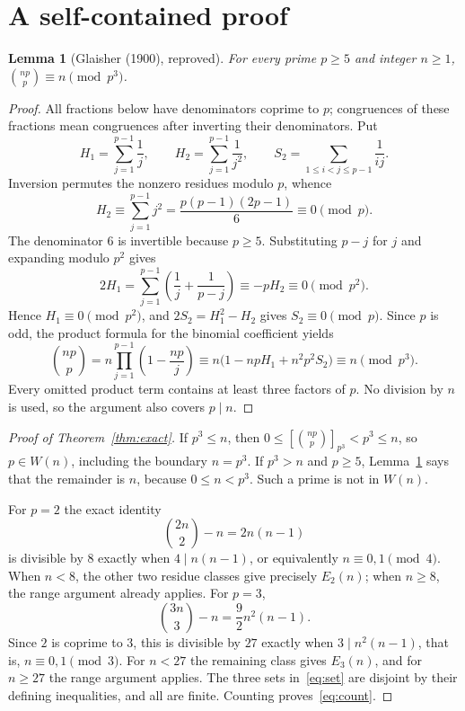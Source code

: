 \documentclass[11pt]{article}
\newtheorem{lemma}[theorem]{Lemma}
\newcommand{\binrem}[3]{\left[\binom{#1#2}{#2}\right]_{#2^{#3}}}
\begin{document}
\section{A self-contained proof}
\begin{lemma}[Glaisher (1900), reproved]\label{lem:glaisher}
For every prime $p\ge5$ and integer $n\ge1$,
$\binom{np}{p}\equiv n\pmod{p^3}$.
\end{lemma}
\begin{proof}
All fractions below have denominators coprime to $p$; congruences of these
fractions mean congruences after inverting their denominators. Put
\[
 H_1=\sum_{j=1}^{p-1}\frac1j,\qquad
 H_2=\sum_{j=1}^{p-1}\frac1{j^2},\qquad
 S_2=\sum_{1\le i<j\le p-1}\frac1{ij}.
\]
Inversion permutes the nonzero residues modulo $p$, whence
\[
 H_2\equiv\sum_{j=1}^{p-1}j^2
 =\frac{p(p-1)(2p-1)}6\equiv0\pmod p.
\]
The denominator $6$ is invertible because $p\ge5$. Substituting $p-j$ for
$j$ and expanding modulo $p^2$ gives
\[
 2H_1=\sum_{j=1}^{p-1}\left(\frac1j+\frac1{p-j}\right)
 \equiv-pH_2\equiv0\pmod{p^2}.
\]
Hence $H_1\equiv0\pmod{p^2}$, and
$2S_2=H_1^2-H_2$ gives $S_2\equiv0\pmod p$.
Since $p$ is odd, the product formula for the binomial coefficient yields
\[
 \binom{np}{p}
 =n\prod_{j=1}^{p-1}\left(1-\frac{np}{j}\right)
 \equiv n\bigl(1-npH_1+n^2p^2S_2\bigr)
 \equiv n\pmod{p^3}.
\]
Every omitted product term contains at least three factors of $p$.
No division by $n$ is used, so the argument also covers $p\mid n$.
\end{proof}

\begin{proof}[Proof of Theorem~\ref{thm:exact}]
If $p^3\le n$, then $0\le\binrem{n}{p}{3}<p^3\le n$, so $p\in W(n)$,
including the boundary $n=p^3$.
If $p^3>n$ and $p\ge5$, Lemma~\ref{lem:glaisher} says that the remainder
is $n$, because $0\le n<p^3$. Such a prime is not in $W(n)$.

For $p=2$ the exact identity
\[
 \binom{2n}{2}-n=2n(n-1)
\]
is divisible by $8$ exactly when $4\mid n(n-1)$, or equivalently
$n\equiv0,1\pmod4$. When $n<8$, the other two residue classes give precisely
$E_2(n)$; when $n\ge8$, the range argument already applies.
For $p=3$,
\[
 \binom{3n}{3}-n=\frac92 n^2(n-1).
\]
Since $2$ is coprime to $3$, this is divisible by $27$ exactly when
$3\mid n^2(n-1)$, that is, $n\equiv0,1\pmod3$.
For $n<27$ the remaining class gives $E_3(n)$, and for $n\ge27$ the range
argument applies. The three sets in~\eqref{eq:set} are disjoint by their
defining inequalities, and all are finite. Counting proves~\eqref{eq:count}.
\end{proof}
\end{document}
